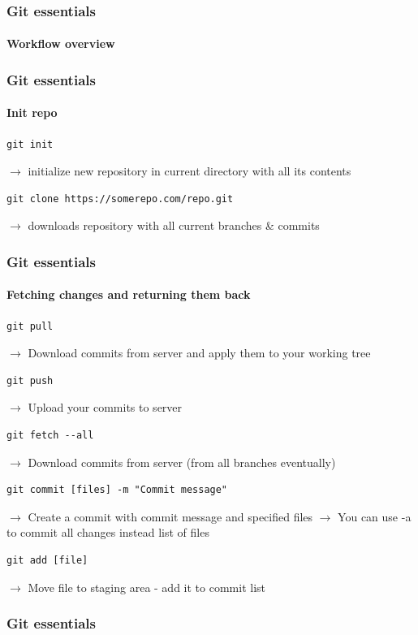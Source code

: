 \documentclass[aspectratio=169]{beamer}
\newcommand{\adjustimg}{%
  \checkoddpage%
  \ifoddpage\hspace*{\dimexpr\evensidemargin-\oddsidemargin}\else\hspace*{-\dimexpr\evensidemargin-\oddsidemargin}\fi%
}
\newcommand{\centerimg}[2][width=\textwidth]{%
  \makebox[\textwidth]{\adjustimg\texttt{[image: \#2]}}%
}
\begin{document}
    \begin{frame}
        \frametitle{Git essentials}
        \framesubtitle{Workflow overview}
        \noindent\centerimg[width=0.8\textwidth]{workflow.png}
    \end{frame}
    \begin{frame}[fragile]
        \frametitle{Git essentials}
        \framesubtitle{Init repo}
        \begin{lstlisting}[gobble=12]
            git init
        \end{lstlisting}
        $\rightarrow$ initialize new repository in current directory with all its contents
        \begin{lstlisting}[gobble=12]
            git clone https://somerepo.com/repo.git
        \end{lstlisting}
        $\rightarrow$ downloads repository with all current branches \& commits
    \end{frame}
    \begin{frame}[fragile]
        \frametitle{Git essentials}
        \framesubtitle{Fetching changes and returning them back}
        \begin{lstlisting}[gobble=12]
            git pull
        \end{lstlisting}
        $\rightarrow$ Download commits from server and apply them to your working tree
        \begin{lstlisting}[gobble=12]
            git push
        \end{lstlisting}
        $\rightarrow$ Upload your commits to server
        \begin{lstlisting}[gobble=12]
            git fetch --all
        \end{lstlisting}
        $\rightarrow$ Download commits from server (from all branches eventually)
        \begin{lstlisting}[gobble=12]
            git commit [files] -m "Commit message"
        \end{lstlisting}
        $\rightarrow$ Create a commit with commit message and specified files\newline
        $\rightarrow$ You can use -a to commit all changes instead list of files
        \begin{lstlisting}[gobble=12]
            git add [file]
        \end{lstlisting}
        $\rightarrow$ Move file to staging area - add it to commit list
    \end{frame}
    \begin{frame}
        \frametitle{Git essentials}
        \noindent\centerimg[width=0.6\textwidth]{git_commit.png}
    \end{frame}
\end{document}
